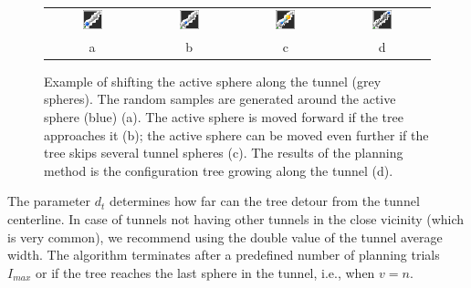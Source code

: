 \documentclass{bmcart}
\def\qrand{q_{rand}}
\def\dtg{d_{t}}
\def\Imax{I_{max}} %
\begin{document}
\begin{figure}
\centering
{
\renewcommand{\tabcolsep}{2pt}
\begin{tabular}{cccc}
\includegraphics[width=0.23\textwidth]{fig/temporary_goal_nodeA} &
\includegraphics[width=0.23\textwidth]{fig/temporary_goal_nodeB} &
\includegraphics[width=0.23\textwidth]{fig/temporary_goal_nodeC} &
\includegraphics[width=0.23\textwidth]{fig/temporary_goal_nodeD} \\
a & b & c & d \\
\end{tabular}
}
\caption{\label{fig::active}
Example of shifting the active sphere along the tunnel (grey spheres).
The random samples are generated around the active sphere (blue) (a).
The active sphere is moved forward if the tree approaches it (b); the active sphere can be moved even further if
the tree skips several tunnel spheres (c).
The results of the planning method is the configuration tree growing along the tunnel (d).
}
\end{figure}

The parameter $\dtg$ determines how far can the tree detour from the tunnel centerline.
In case of tunnels not having other tunnels in the close vicinity (which is very common), we recommend using the double value of the tunnel average width.
The algorithm terminates after a predefined number of planning trials $\Imax$ or if the tree reaches
the last sphere in the tunnel, i.e., when $v = n$.
\end{document}
